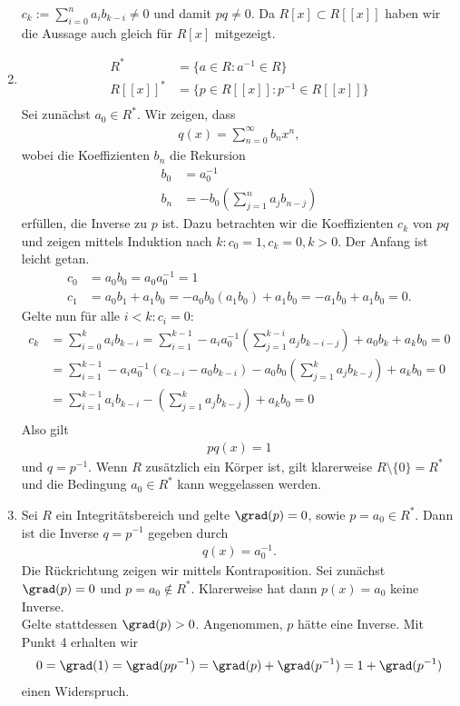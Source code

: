 \begin{solution}
\begin{enumerate}
  $c_k := \sum_{i=0}^n a_ib_{k-i} \neq 0$ und damit $pq \neq 0$.
  Da $R[x] \subset R[[x]]$ haben wir die Aussage auch gleich für $R[x]$
  mitgezeigt.
  \item \begin{align*}
    R^* &= \{a \in R: a^{-1} \in R\} \\
    R[[x]]^* &= \{p \in R[[x]]: p^{-1} \in R[[x]]\} \\
  \end{align*}
  Sei zunächst $a_0 \in R^*$. Wir zeigen, dass
  \begin{align*}
    q(x) = \sum_{n=0}^{\infty}b_nx^n,
  \end{align*}
  wobei die Koeffizienten $b_n$ die Rekursion
  \begin{align*}
    b_0 &= a_0^{-1} \\
    b_n &= -b_0\left(\sum_{j=1}^na_jb_{n-j}\right)
  \end{align*}
  erfüllen, die Inverse zu $p$ ist. Dazu betrachten wir die Koeffizienten $c_k$
  von $pq$ und zeigen mittels Induktion nach $k: c_0 = 1, c_k = 0, k > 0$. Der Anfang ist leicht getan.
  \begin{align*}
    c_0 &= a_0b_0 = a_0a_0^{-1} = 1 \\
    c_1 &= a_0b_1 + a_1b_0 = -a_0b_0(a_1b_0) + a_1b_0 = -a_1b_0 + a_1b_0 = 0.
  \end{align*}
  Gelte nun für alle $i < k: c_i = 0$:
  \begin{align*}
    c_k &= \sum_{i=0}^{k} a_i b_{k-i}
    = \sum_{i=1}^{k-1} -a_ia_0^{-1}\left(\sum_{j=1}^{k-i}a_jb_{k-i-j}\right) + a_0b_k + a_kb_0 = 0 \\
    &= \sum_{i=1}^{k-1} -a_ia_0^{-1}\left(c_{k-i} - a_0b_{k-i}\right) - a_0b_0\left(\sum_{j=1}^ka_jb_{k-j}\right) + a_kb_0 = 0 \\
    &= \sum_{i=1}^{k-1} a_ib_{k-i} - \left(\sum_{j=1}^ka_jb_{k-j}\right) + a_kb_0 = 0 \\
  \end{align*}
  Also gilt
  \begin{align*}
    pq(x) = 1
  \end{align*}
  und $q = p^{-1}$. Wenn $R$ zusätzlich ein Körper ist, gilt klarerweise $R \setminus \{0\} = R^*$
  und die Bedingung $a_0 \in R^*$ kann weggelassen werden.
  \item Sei $R$ ein Integritätsbereich und gelte $\grad(p) = 0$, sowie $p = a_0 \in R^*$.
  Dann ist die Inverse $q = p^{-1}$ gegeben durch
  \begin{align*}
    q(x) = a_0^{-1}.
  \end{align*}
  Die Rückrichtung zeigen wir mittels Kontraposition.
  Sei zunächst $\grad(p) = 0$ und $p = a_0 \notin R^*$.
  Klarerweise hat dann $p(x) = a_0$ keine Inverse. \\
  Gelte stattdessen $\grad(p) > 0$. Angenommen, $p$ hätte eine Inverse.
  Mit Punkt 4 erhalten wir
  \begin{align*}
    0 = \grad(1) = \grad(pp^{-1}) = \grad(p) + \grad(p^{-1}) = 1 + \grad(p^{-1})
  \end{align*}
  einen Widerspruch.
\end{enumerate}
\end{solution}
